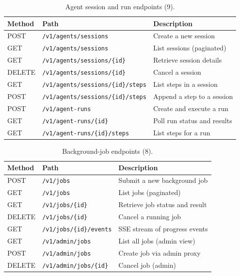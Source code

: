 \documentclass[a4paper,noexaminfo]{sapthesis}
\begin{document}
\begin{table}[ht]
\centering
\caption{Agent session and run endpoints (9).}
\label{tab:app-agent-ep}
\small
\begin{tabularx}{\textwidth}{@{}l l X@{}}
    \hline
    \textbf{Method} & \textbf{Path} & \textbf{Description} \\
    \hline
    POST   & \texttt{/v1/agents/sessions}               & Create a new session \\
    GET    & \texttt{/v1/agents/sessions}               & List sessions (paginated) \\
    GET    & \texttt{/v1/agents/sessions/\{id\}}        & Retrieve session details \\
    DELETE & \texttt{/v1/agents/sessions/\{id\}}        & Cancel a session \\
    GET    & \texttt{/v1/agents/sessions/\{id\}/steps}  & List steps in a session \\
    POST   & \texttt{/v1/agents/sessions/\{id\}/steps}  & Append a step to a session \\
    POST   & \texttt{/v1/agent-runs}                    & Create and execute a run \\
    GET    & \texttt{/v1/agent-runs/\{id\}}             & Poll run status and results \\
    GET    & \texttt{/v1/agent-runs/\{id\}/steps}       & List steps for a run \\
    \hline
\end{tabularx}
\end{table}

\begin{table}[ht]
\centering
\caption{Background-job endpoints (8).}
\label{tab:app-job-ep}
\small
\begin{tabularx}{\textwidth}{@{}l l X@{}}
    \hline
    \textbf{Method} & \textbf{Path} & \textbf{Description} \\
    \hline
    POST   & \texttt{/v1/jobs}               & Submit a new background job \\
    GET    & \texttt{/v1/jobs}               & List jobs (paginated) \\
    GET    & \texttt{/v1/jobs/\{id\}}        & Retrieve job status and result \\
    DELETE & \texttt{/v1/jobs/\{id\}}        & Cancel a running job \\
    GET    & \texttt{/v1/jobs/\{id\}/events} & SSE stream of progress events \\
    \hline
    GET    & \texttt{/v1/admin/jobs}           & List all jobs (admin view) \\
    POST   & \texttt{/v1/admin/jobs}           & Create job via admin proxy \\
    DELETE & \texttt{/v1/admin/jobs/\{id\}}  & Cancel job (admin) \\
    \hline
\end{tabularx}
\end{table}
\end{document}
